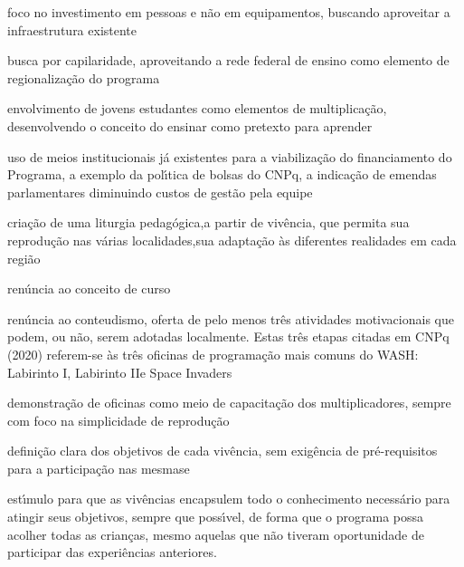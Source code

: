 \documentclass[
12pt,		%
openright,	%
twoside,  %
a4paper,			%
chapter=TITLE,		%
english,			%
french,				%
spanish,			%
brazil				%
]{USPSC-classe/USPSC}
\begin{document}
\begin{alineas}
\item \textquotedbl foco no investimento em pessoas e n\~ao em equipamentos, buscando aproveitar a infraestrutura existente\textquotedbl 
\item \textquotedbl busca por capilaridade, aproveitando a rede federal de ensino como elemento de regionaliza\c{c}\~ao do programa\textquotedbl 
\item \textquotedbl envolvimento de jovens estudantes como elementos de multiplica\c{c}\~ao, desenvolvendo o conceito do ensinar como pretexto para aprender\textquotedbl 
\item \textquotedbl uso de meios institucionais j\'a existentes para a viabiliza\c{c}\~ao do financiamento do Programa, a exemplo da pol\'{\i}tica de bolsas do CNPq, a indica\c{c}\~ao de emendas parlamentares diminuindo custos de gest\~ao pela equipe\textquotedbl 
\item \textquotedbl cria\c{c}\~ao de uma  \textquotedbl liturgia pedag\'ogica,\textquotedbl  a partir de viv\^encia, que permita sua reprodu\c{c}\~ao nas v\'arias localidades,sua adapta\c{c}\~ao \`as diferentes realidades em cada regi\~ao\textquotedbl 
\item \textquotedbl ren\'uncia ao conceito de curso\textquotedbl 
\item \textquotedbl ren\'uncia ao conteudismo, oferta de pelo menos tr\^es atividades motivacionais que podem, ou n\~ao, serem adotadas localmente\textquotedbl . Estas tr\^es etapas citadas em  CNPq (2020) referem-se \`as tr\^es oficinas de programa\c{c}\~ao mais comuns do WASH: \textquotedbl Labirinto I\textquotedbl , \textquotedbl Labirinto II\textquotedbl  e \textquotedbl Space Invaders\textquotedbl 
\item \textquotedbl demonstra\c{c}\~ao de oficinas como meio de capacita\c{c}\~ao dos multiplicadores, sempre com foco na simplicidade de reprodu\c{c}\~ao\textquotedbl 
\item \textquotedbl defini\c{c}\~ao clara dos objetivos de cada viv\^encia, sem exig\^encia de pr\'e-requisitos para a participa\c{c}\~ao nas mesmas\textquotedbl  e
\item \textquotedbl est\'{\i}mulo para que as viv\^encias encapsulem todo o conhecimento necess\'ario para  atingir  seus objetivos, sempre que poss\'{\i}vel, de forma que o programa possa acolher todas as crian\c{c}as, mesmo aquelas que n\~ao tiveram oportunidade de participar das experi\^encias anteriores.\textquotedbl 
\end{alineas}
\end{document}
